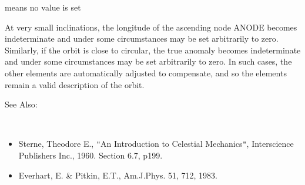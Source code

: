 \documentclass[twoside,11pt]{article}
\renewcommand{\_}{\texttt{\symbol{95}}}
\newcommand{\sstitemlist}[1]{
  \mbox{} \\
  \vspace{-3.5ex}
  \begin{itemize}
     #1
  \end{itemize}
}
\newcommand{\sstitem}{\item}
\newcommand{\sstitemlist}[1]{
      \begin{itemize}
         #1
      \end{itemize}
      \\
   }
\newcommand{\sstitem}{\item}
\begin{document}
{{{         \sstitem
               means no value is set

         \sstitem
           At very small inclinations, the longitude of the ascending node
             ANODE becomes indeterminate and under some circumstances may be
             set arbitrarily to zero.  Similarly, if the orbit is close to
             circular, the true anomaly becomes indeterminate and under some
             circumstances may be set arbitrarily to zero.  In such cases,
             the other elements are automatically adjusted to compensate,
             and so the elements remain a valid description of the orbit.

      }
      See Also:
      \sstitemlist{

         \sstitem
           Sterne, Theodore E., {\tt "}An Introduction to Celestial Mechanics{\tt "},
             Interscience Publishers Inc., 1960.  Section 6.7, p199.

         \sstitem
           Everhart, E. \& Pitkin, E.T., Am.J.Phys. 51, 712, 1983.
      }
   }
}
\end{document}
